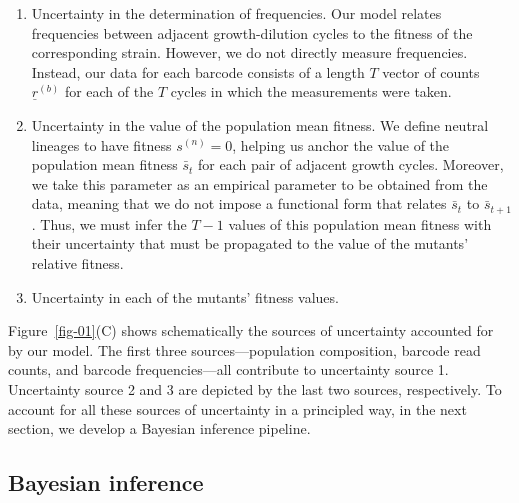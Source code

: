 \documentclass[
]{scrartcl}
\providecommand{\tightlist}{%
  \setlength{\itemsep}{0pt}\setlength{\parskip}{0pt}}\usepackage{longtable,booktabs,array}
\begin{document}
\begin{refsegment}
\begin{enumerate}
\def\labelenumi{\arabic{enumi}.}
\tightlist
\item
  Uncertainty in the determination of frequencies. Our model relates
  frequencies between adjacent growth-dilution cycles to the fitness of
  the corresponding strain. However, we do not directly measure
  frequencies. Instead, our data for each barcode consists of a length
  \(T\) vector of counts \(\underline{r}^{(b)}\) for each of the \(T\)
  cycles in which the measurements were taken.
\item
  Uncertainty in the value of the population mean fitness. We define
  neutral lineages to have fitness \(s^{(n)} = 0\), helping us anchor
  the value of the population mean fitness \(\bar{s}_t\) for each pair
  of adjacent growth cycles. Moreover, we take this parameter as an
  empirical parameter to be obtained from the data, meaning that we do
  not impose a functional form that relates \(\bar{s}_t\) to
  \(\bar{s}_{t+1}\). Thus, we must infer the \(T-1\) values of this
  population mean fitness with their uncertainty that must be propagated
  to the value of the mutants' relative fitness.
\item
  Uncertainty in each of the mutants' fitness values.
\end{enumerate}

Figure~\ref{fig-01}(C) shows schematically the sources of uncertainty
accounted for by our model. The first three sources---population
composition, barcode read counts, and barcode frequencies---all
contribute to uncertainty source 1. Uncertainty source 2 and 3 are
depicted by the last two sources, respectively. To account for all these
sources of uncertainty in a principled way, in the next section, we
develop a Bayesian inference pipeline.

\hypertarget{sec-bayesian_inference}{%
\subsection{Bayesian inference}\label{sec-bayesian_inference}}


\end{refsegment}
\end{document}
